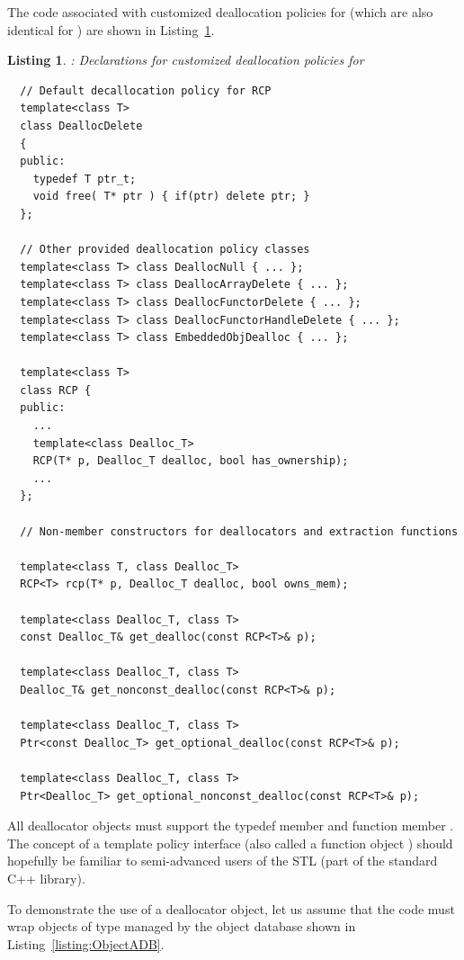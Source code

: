 \documentclass[pdf,ps2pdf,11pt]{SANDreport}
\newtheorem{listing}{Listing}
\begin{document}
The code associated with customized deallocation policies for
{} (which are also identical for {}) are shown
in Listing~\ref{listing:RCP-dealloc}.

\begin{listing}: Declarations for customized deallocation policies
for {} \\
\label{listing:RCP-dealloc}
{\small\begin{verbatim}
  // Default decallocation policy for RCP
  template<class T>
  class DeallocDelete
  {
  public:
    typedef T ptr_t;
    void free( T* ptr ) { if(ptr) delete ptr; }
  };

  // Other provided deallocation policy classes
  template<class T> class DeallocNull { ... };
  template<class T> class DeallocArrayDelete { ... };
  template<class T> class DeallocFunctorDelete { ... };
  template<class T> class DeallocFunctorHandleDelete { ... };
  template<class T> class EmbeddedObjDealloc { ... };

  template<class T>
  class RCP {
  public:
    ...
    template<class Dealloc_T>
    RCP(T* p, Dealloc_T dealloc, bool has_ownership);
    ...
  };

  // Non-member constructors for deallocators and extraction functions
  
  template<class T, class Dealloc_T>
  RCP<T> rcp(T* p, Dealloc_T dealloc, bool owns_mem);
  
  template<class Dealloc_T, class T>
  const Dealloc_T& get_dealloc(const RCP<T>& p);
  
  template<class Dealloc_T, class T>
  Dealloc_T& get_nonconst_dealloc(const RCP<T>& p);
  
  template<class Dealloc_T, class T>
  Ptr<const Dealloc_T> get_optional_dealloc(const RCP<T>& p);
  
  template<class Dealloc_T, class T> 
  Ptr<Dealloc_T> get_optional_nonconst_dealloc(const RCP<T>& p);

\end{verbatim}}
\end{listing}

All deallocator objects must support the typedef member {}
and function member {}.  The concept of a template
policy interface (also called a function object
\cite[Section 18.4]{stroustrup97}) should hopefully be familiar to
semi-advanced users of the STL (part of the standard C++ library).

To demonstrate the use of a deallocator object, let us assume that the
code must wrap objects of type {} managed by the object
database shown in Listing~\ref{listing:ObjectADB}.
\end{document}
